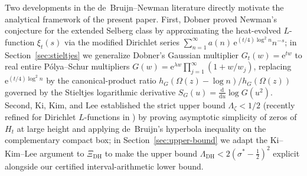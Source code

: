 \documentclass[11pt,a4paper,reqno]{amsart}
\theoremstyle{definition}
\theoremstyle{remark}
\numberwithin{equation}{section}
\newcommand{\dd}{\mathrm{d}}
\newcommand{\ee}{\mathrm{e}}
\begin{document}
Two developments in the de~Bruijn--Newman literature directly motivate the analytical framework of the present paper. First, Dobner \cite{dobner2021} proved Newman's conjecture for the extended Selberg class by approximating the heat-evolved $L$-function $\xi_t(s)$ via the modified Dirichlet series $\sum_{n=1}^{\infty} a(n)\,\ee^{(t/4)\log^2 n} n^{-s}$; in Section~\ref{sec:stieltjes} we generalize Dobner's Gaussian multiplier $G_t(w) = \ee^{tw}$ to real entire P\'olya--Schur multipliers $G(w) = \ee^{\lambda w}\prod_{j=1}^{\infty}(1 + w/w_j)$, replacing $\ee^{(t/4)\log^2 n}$ by the canonical-product ratio $h_G(\Omega(z) - \log n)/h_G(\Omega(z))$ governed by the Stieltjes logarithmic derivative $S_G(u) = \frac{\dd}{\dd u}\log G(u^2)$. Second, Ki, Kim, and Lee \cite{kikimlee2009} established the strict upper bound $\Lambda_\zeta < 1/2$ (recently refined for Dirichlet $L$-functions in \cite{freire2026}) by proving asymptotic simplicity of zeros of $H_t$ at large height and applying de~Bruijn's hyperbola inequality on the complementary compact box; in Section~\ref{sec:upper-bound} we adapt the Ki--Kim--Lee argument to $\Xi_{\mathrm{DH}}$ to make the upper bound $\Lambda_{\mathrm{DH}} < 2(\sigma^* - \frac{1}{2})^2$ explicit alongside our certified interval-arithmetic lower bound.
\end{document}
